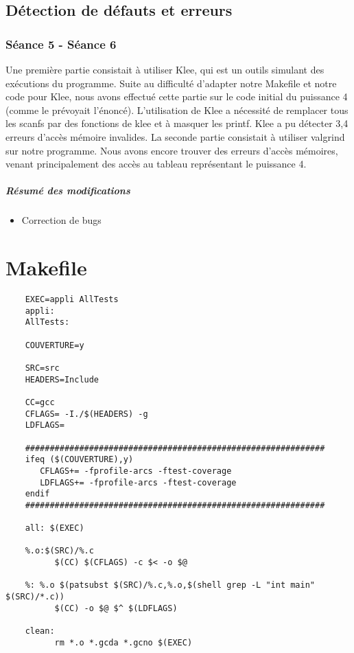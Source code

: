 \documentclass{article}
\begin{document}
\section{Détection de défauts et erreurs}
\subsection{Séance 5 - Séance 6}

Une première partie consistait à utiliser Klee, qui est un outils simulant des exécutions du programme. Suite au difficulté d'adapter notre Makefile et notre code pour Klee, nous avons effectué cette partie sur le code initial du puissance 4 (comme le prévoyait l'énoncé). L'utilisation de Klee a nécessité de remplacer tous les scanfs par des fonctions de klee et à masquer les printf. Klee a pu détecter 3,4 erreurs d'accès mémoire invalides.
La seconde partie consistait à utiliser valgrind sur notre programme. Nous avons encore trouver des erreurs d'accès mémoires, venant principalement des accès au tableau représentant le puissance 4.

\paragraph{Résumé des modifications}
\begin{itemize}
\item Correction de bugs
\end{itemize}

\newpage

\appendix
\chapter{Makefile}
  \begin{lstlisting}
    EXEC=appli AllTests
    appli:
    AllTests:

    COUVERTURE=y

    SRC=src
    HEADERS=Include

    CC=gcc
    CFLAGS= -I./$(HEADERS) -g
    LDFLAGS=

    #############################################################
    ifeq ($(COUVERTURE),y)
       CFLAGS+= -fprofile-arcs -ftest-coverage 
       LDFLAGS+= -fprofile-arcs -ftest-coverage
    endif
    #############################################################

    all: $(EXEC)

    %.o:$(SRC)/%.c
          $(CC) $(CFLAGS) -c $< -o $@

    %: %.o $(patsubst $(SRC)/%.c,%.o,$(shell grep -L "int main" $(SRC)/*.c))
          $(CC) -o $@ $^ $(LDFLAGS)

    clean:
          rm *.o *.gcda *.gcno $(EXEC)
  \end{lstlisting}
\end{document}
